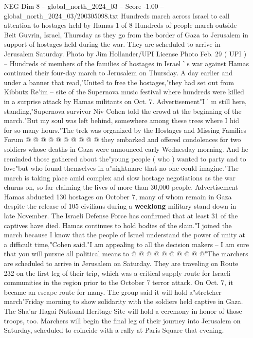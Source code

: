 \begin{textsample}{NEG Dim 8 – global\_north\_2024\_03 – Score -1.00 – global\_north\_2024\_03/200305098.txt}  \label{ex:f8_neg_224}
Hundreds march across Israel to call attention to hostages held by Hamas 1 of 8 Hundreds of people march outside Beit Guvrin, Israel, Thursday as they go from the border of Gaza to Jerusalem in support of hostages held during the war.
They are scheduled to arrive in Jerusalem Saturday.
Photo by Jim Hollander/UPI License Photo Feb. 29 ( UPI ) -- Hundreds of members of the families of hostages in Israel ' s war against Hamas continued their four-day march to Jerusalem on Thursday.
A day earlier and under a banner that read,"United to free the hostages,"they had set out from Kibbutz Re'im -- site of the Supernova music festival where hundreds were killed in a surprise attack by Hamas militants on Oct. 7.
Advertisement"I ' m still here, standing,"Supernova survivor Niv Cohen told the crowd at the beginning of the march."But my soul was left behind, somewhere among these trees where I hid for so many hours."The trek was organized by the Hostages and Missing Families Forum @ @ @ @ @ @ @ @ @ @ they embarked and offered condolences for two soldiers whose deaths in Gaza were announced early Wednesday morning.
And he reminded those gathered about the"young people ( who ) wanted to party and to love"but who found themselves in a"nightmare that no one could imagine."The march is taking place amid complex and slow hostage negotiations as the war churns on, so far claiming the lives of more than 30,000 people.
Advertisement Hamas abducted 130 hostages on October 7, many of whom remain in Gaza despite the release of 105 civilians during a \textbf{weeklong} military stand down in late November.
The Israeli Defense Force has confirmed that at least 31 of the captives have died.
Hamas continues to hold bodies of the slain."I joined the march because I know that the people of Israel understand the power of unity at a difficult time,"Cohen said."I am appealing to all the decision makers -- I am sure that you will pursue all political means to @ @ @ @ @ @ @ @ @ @"The marchers are scheduled to arrive in Jerusalem on Saturday.
They are traveling on Route 232 on the first leg of their trip, which was a critical supply route for Israeli communities in the region prior to the October 7 terror attack.
On Oct. 7, it became an escape route for many.
The group said it will hold a"stretcher march"Friday morning to show solidarity with the soldiers held captive in Gaza.
The Sha'ar Hagai National Heritage Site will hold a ceremony in honor of those troops, too.
Marchers will begin the final leg of their journey into Jerusalem on Saturday, scheduled to coincide with a rally at Paris Square that evening.

\end{textsample}
